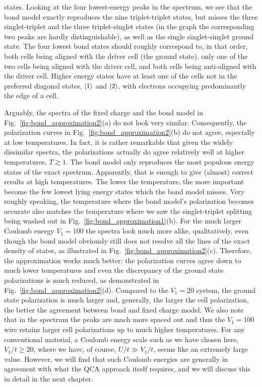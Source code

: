 states. Looking at the four lowest-energy peaks in the spectrum, we see that the
bond model exactly reproduces the nine triplet-triplet states, but misses the
three singlet-triplet and the three triplet-singlet states (in the graph the
corresponding two peaks are hardly distinguishable), as well as the single
singlet-singlet ground state. The four lowest bond states should roughly
correspond to, in that order, both cells being aligned with the driver cell (the
ground state), only one of the two cells being aligned with the driver cell, and
both cells being anti-aligned with the driver cell. Higher energy states have at
least one of the cells not in the preferred diagonal states, $\left|1\right>$ and
$\left|2\right>$, with electrons occupying predominantly the edge of a cell.

Arguably, the spectra of the fixed charge and the bond model in
Fig.~\ref{fig:bond_approximation2}(a) do not look very similar. Consequently,
the polarization curves in Fig.~\ref{fig:bond_approximation2}(b) do not agree,
especially at low temperatures. In fact, it is rather remarkable that given the
widely dissimilar spectra, the polarizations actually do agree relatively well
at higher temperatures, $T \gtrsim 1$. The bond model only reproduces the most
populous energy states of the exact spectrum. Apparently, that is enough to give
(almost) correct results at high temperatures. The lower the temperature, the
more important become the few lowest lying energy states which the bond model
misses. Very roughly speaking, the temperature where the bond model's
polarization becomes accurate also matches the temperature where we saw the
singlet-triplet splitting being washed out in
Fig.~\ref{fig:bond_approximation1}(b). For the much larger Coulomb energy $V_1 =
100$ the spectra look much more alike, qualitatively, even though the bond model
obviously still does not resolve all the lines of the exact density of states,
as illustrated in Fig.~\ref{fig:bond_approximation2}(c). Therefore, the
approximation works much better: the polarization curves agree down to much
lower temperatures and even the discrepancy of the ground state polarizations is
much reduced, as demonstrated in Fig.~\ref{fig:bond_approximation2}(d).
Compared to the $V_1 = 20$ system, the ground state polarization is much larger
and, generally, the larger the cell polarization, the better the agreement
between bond and fixed charge model. We also note that in the spectrum the peaks
are much more spaced out and thus the $V_1 = 100$ wire retains larger cell
polarizations up to much higher temperatures. For any conventional material, a
Coulomb energy scale such as we have chosen here, $V_1/t \ge 20$, where we have,
of course, $U/t \gg V_1/t$, seems like an extremely large value. However, we
will find that such Coulomb energies are generally in agreement with what the
QCA approach itself requires, and we will discuss this in detail in the next
chapter.

